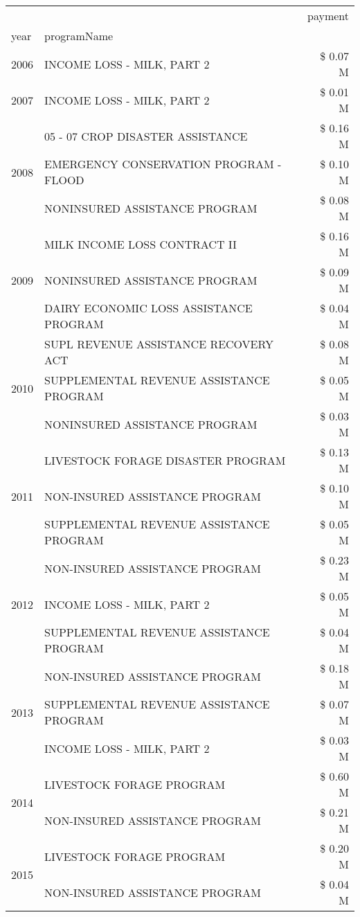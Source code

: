 \begin{tabular}{llr}
\toprule
 &  & payment \\
year & programName &  \\
\midrule
2006 & INCOME LOSS - MILK, PART 2 & \$ 0.07 M \\
\cline{1-3}
2007 & INCOME LOSS - MILK, PART 2 & \$ 0.01 M \\
\cline{1-3}
\multirow[t]{3}{*}{2008} & 05 - 07 CROP DISASTER ASSISTANCE & \$ 0.16 M \\
 & EMERGENCY CONSERVATION PROGRAM - FLOOD & \$ 0.10 M \\
 & NONINSURED ASSISTANCE PROGRAM & \$ 0.08 M \\
\cline{1-3}
\multirow[t]{3}{*}{2009} & MILK INCOME LOSS CONTRACT II & \$ 0.16 M \\
 & NONINSURED ASSISTANCE PROGRAM & \$ 0.09 M \\
 & DAIRY ECONOMIC LOSS ASSISTANCE PROGRAM & \$ 0.04 M \\
\cline{1-3}
\multirow[t]{3}{*}{2010} & SUPL REVENUE ASSISTANCE RECOVERY ACT & \$ 0.08 M \\
 & SUPPLEMENTAL REVENUE ASSISTANCE PROGRAM & \$ 0.05 M \\
 & NONINSURED ASSISTANCE PROGRAM & \$ 0.03 M \\
\cline{1-3}
\multirow[t]{3}{*}{2011} & LIVESTOCK FORAGE DISASTER PROGRAM & \$ 0.13 M \\
 & NON-INSURED ASSISTANCE PROGRAM & \$ 0.10 M \\
 & SUPPLEMENTAL REVENUE ASSISTANCE PROGRAM & \$ 0.05 M \\
\cline{1-3}
\multirow[t]{3}{*}{2012} & NON-INSURED ASSISTANCE PROGRAM & \$ 0.23 M \\
 & INCOME LOSS - MILK, PART 2 & \$ 0.05 M \\
 & SUPPLEMENTAL REVENUE ASSISTANCE PROGRAM & \$ 0.04 M \\
\cline{1-3}
\multirow[t]{3}{*}{2013} & NON-INSURED ASSISTANCE PROGRAM & \$ 0.18 M \\
 & SUPPLEMENTAL REVENUE ASSISTANCE PROGRAM & \$ 0.07 M \\
 & INCOME LOSS - MILK, PART 2 & \$ 0.03 M \\
\cline{1-3}
\multirow[t]{2}{*}{2014} & LIVESTOCK FORAGE PROGRAM & \$ 0.60 M \\
 & NON-INSURED ASSISTANCE PROGRAM & \$ 0.21 M \\
\cline{1-3}
\multirow[t]{3}{*}{2015} & LIVESTOCK FORAGE PROGRAM & \$ 0.20 M \\
 & NON-INSURED ASSISTANCE PROGRAM & \$ 0.04 M \\

\end{tabular}
